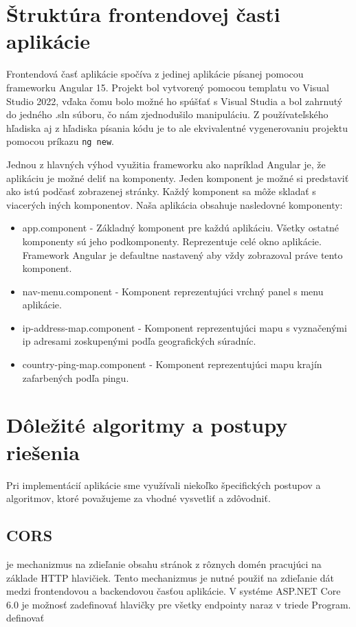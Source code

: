 \section{Štruktúra frontendovej časti aplikácie}
Frontendová časť aplikácie spočíva z jedinej aplikácie písanej pomocou frameworku Angular 15. Projekt bol vytvorený pomocou templatu vo Visual Studio 2022, vďaka čomu bolo možné ho 
spúšťať s Visual Studia a bol zahrnutý do jedného .sln súboru, čo nám zjednodušilo manipuláciu. Z používateľského hľadiska aj z hľadiska písania kódu je to ale ekvivalentné 
vygenerovaniu projektu pomocou príkazu \lstinline{ng new}.

Jednou z hlavných výhod využitia frameworku ako napríklad Angular je, že aplikáciu je možné deliť na komponenty. Jeden komponent je možné si predstaviť ako istú podčasť zobrazenej stránky. 
Každý komponent sa môže skladať s viacerých iných komponentov. Naša aplikácia obsahuje nasledovné komponenty:
\begin{itemize}
    \item app.component
    - Základný komponent pre každú aplikáciu. Všetky ostatné komponenty sú jeho podkomponenty. Reprezentuje celé okno aplikácie. Framework Angular je defaultne nastavený aby vždy 
    zobrazoval práve tento komponent. 
    \item nav-menu.component
    - Komponent reprezentujúci vrchný panel s menu aplikácie.
    \item ip-address-map.component
    - Komponent reprezentujúci mapu s vyznačenými ip adresami zoskupenými podľa geografických súradníc.
    \item country-ping-map.component 
    - Komponent reprezentujúci mapu krajín zafarbených podľa pingu.
\end{itemize}

\section{Dôležité algoritmy a postupy riešenia}
\label{postupy}

Pri implementácií aplikácie sme využívali niekoľko špecifických postupov a algoritmov, ktoré považujeme za vhodné vysvetliť a zdôvodniť. 

\subsection{CORS}
 je mechanizmus na zdieľanie obsahu stránok z rôznych domén pracujúci na základe HTTP hlavičiek. Tento mechanizmus je nutné použiť na zdieľanie dát medzi
frontendovou a backendovou časťou aplikácie. V systéme ASP.NET Core 6.0 je možnosť zadefinovať  hlavičky pre všetky endpointy naraz v triede Program. 
definovať 

